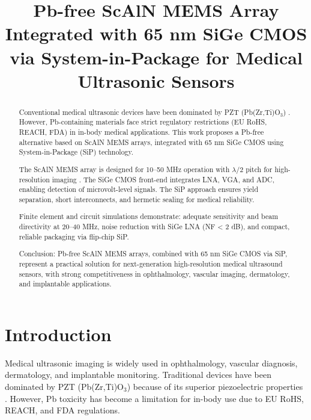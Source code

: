 \documentclass[conference]{IEEEtran}
\begin{document}
\title{Pb-free ScAlN MEMS Array Integrated with 65 nm SiGe CMOS via System-in-Package for Medical Ultrasonic Sensors}

\author{
}

\maketitle

\begin{abstract}
Conventional medical ultrasonic devices have been dominated by PZT (Pb(Zr,Ti)O$_3$) \cite{akata2009pzt}. 
However, Pb-containing materials face strict regulatory restrictions (EU RoHS, REACH, FDA) in in-body medical applications. 
This work proposes a Pb-free alternative based on ScAlN MEMS arrays, integrated with 65 nm SiGe CMOS using System-in-Package (SiP) technology.

The ScAlN MEMS array is designed for 10--50 MHz operation with $\lambda/2$ pitch for high-resolution imaging \cite{akrout2018scaln}. 
The SiGe CMOS front-end integrates LNA, VGA, and ADC, enabling detection of microvolt-level signals. 
The SiP approach ensures yield separation, short interconnects, and hermetic sealing for medical reliability.

Finite element and circuit simulations demonstrate: adequate sensitivity and beam directivity at 20--40 MHz, 
noise reduction with SiGe LNA (NF < 2 dB), and compact, reliable packaging via flip-chip SiP.

Conclusion: Pb-free ScAlN MEMS arrays, combined with 65 nm SiGe CMOS via SiP, represent a practical solution for next-generation 
high-resolution medical ultrasound sensors, with strong competitiveness in ophthalmology, vascular imaging, dermatology, and implantable applications.
\end{abstract}

\section{Introduction}
Medical ultrasonic imaging is widely used in ophthalmology, vascular diagnosis, dermatology, and implantable monitoring. 
Traditional devices have been dominated by PZT (Pb(Zr,Ti)O$_3$) because of its superior piezoelectric properties \cite{akata2009pzt}. 
However, Pb toxicity has become a limitation for in-body use due to EU RoHS, REACH, and FDA regulations.
\end{document}
